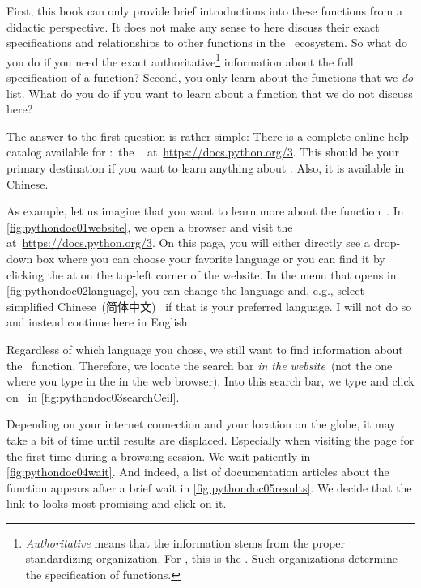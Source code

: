 \begin{noglslink}
First, this book can only provide brief introductions into these functions from a didactic perspective.
It does not make any sense to here discuss their exact specifications and relationships to other functions in the \python\ ecosystem.
So what do you do if you need the exact authoritative\footnote{%
\emph{Authoritative} means that the information stems from the proper standardizing organization. %
For \python, this is the . %
Such organizations determine the specification of functions.%
} information about the full specification of a function?
Second, you only learn about the functions that we \emph{do} list.
What do you do if you want to learn about a function that we do not discuss here?

The answer to the first question is rather simple:
There is a complete online help catalog available for \python:~the ~\cite{PSF:P3D} at~\url{https://docs.python.org/3}.
This should be your primary destination if you want to learn anything about \python.
Also, it is available in Chinese.

As example, let us imagine that you want to learn more about the function~.
In \cref{fig:pythondoc01website}, we open a browser and visit the ~\cite{PSF:P3D} at~\url{https://docs.python.org/3}.
On this page, you will either directly see a drop-down box where you can choose your favorite language or you can find it by clicking the \menu{\threeBarButton} at on the top-left corner of the website.
In the menu that opens in \cref{fig:pythondoc02language}, you can change the language and, e.g., select simplified Chinese~(简体中文)~\cite{SCR1956ROTSCOPTSCCS1} if that is your preferred language.
I will not do so and instead continue here in English.

Regardless of which language you chose, we still want to find information about the ~function.
Therefore, we locate the search bar \emph{in the website}~(not the one where you type in the  in the web browser).
Into this search bar, we type  and click on~ in \cref{fig:pythondoc03searchCeil}.

Depending on your internet connection and your location on the globe, it may take a bit of time until results are displaced.
Especially when visiting the page for the first time during a browsing session.
We wait patiently in \cref{fig:pythondoc04wait}.
And indeed, a list of documentation articles about the  function appears after a brief wait in \cref{fig:pythondoc05results}.
We decide that the link to  looks most promising and click on it.


\end{noglslink}
